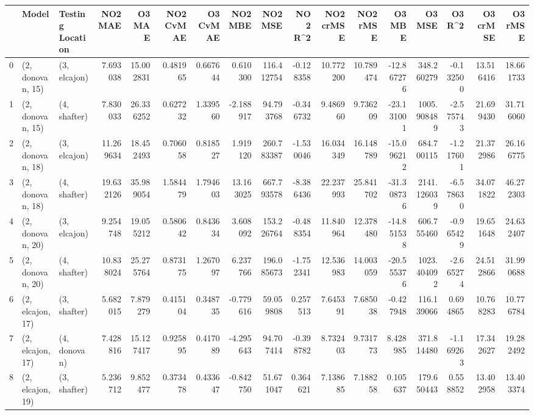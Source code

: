 \begin{tabular}{lllrrrrrrrrrrrrrr}
\toprule
{} &             Model & Testing Location &    NO2 MAE &     O3 MAE &  NO2 CvMAE &  O3 CvMAE &    NO2 MBE &     NO2 MSE &   NO2 R\textasciicircum2 &  NO2 crMSE &   NO2 rMSE &     O3 MBE &       O3 MSE &    O3 R\textasciicircum2 &   O3 crMSE &    O3 rMSE \\
\midrule
0  &  (2, donovan, 15) &     (3, elcajon) &   7.693038 &  15.002831 &   0.481965 &  0.667644 &   0.610300 &  116.412754 & -0.128358 &  10.772200 &  10.789474 & -12.867276 &   348.260279 & -0.132500 &  13.516416 &  18.661733 \\
1  &  (2, donovan, 15) &     (4, shafter) &   7.830033 &  26.336252 &   0.627232 &  1.339560 &  -2.188917 &   94.793768 & -0.346732 &   9.486960 &   9.736209 & -23.131001 &  1005.908489 & -2.575743 &  21.699430 &  31.716060 \\
2  &  (2, donovan, 18) &     (3, elcajon) &  11.269634 &  18.452493 &   0.706058 &  0.818527 &   1.919120 &  260.783387 & -1.530046 &  16.034349 &  16.148789 & -15.096212 &   684.700115 & -1.217601 &  21.372986 &  26.166775 \\
3  &  (2, donovan, 18) &     (4, shafter) &  19.632126 &  35.989054 &   1.584479 &  1.794603 &  13.163025 &  667.793578 & -8.386436 &  22.237993 &  25.841702 & -31.308736 &  2141.126039 & -6.578630 &  34.071822 &  46.272303 \\
4  &  (2, donovan, 20) &     (3, elcajon) &   9.254748 &  19.055212 &   0.580642 &  0.843634 &   3.608092 &  153.226764 & -0.488354 &  11.840964 &  12.378480 & -14.851538 &   606.755460 & -0.965429 &  19.651648 &  24.632407 \\
5  &  (2, donovan, 20) &     (4, shafter) &  10.838024 &  25.275764 &   0.873175 &  1.267097 &   6.237766 &  196.085673 & -1.752341 &  12.536983 &  14.003059 & -20.555376 &  1023.404092 & -2.665274 &  24.512866 &  31.990688 \\
6  &  (2, elcajon, 17) &     (3, shafter) &   5.682015 &   7.879279 &   0.415104 &  0.348735 &  -0.779616 &   59.059808 &  0.257513 &   7.645391 &   7.685038 &  -0.427948 &   116.139066 &  0.694865 &  10.768283 &  10.776784 \\
7  &  (2, elcajon, 17) &     (4, donovan) &   7.428816 &  15.127417 &   0.925895 &  0.417089 &  -4.295643 &   94.707414 & -0.398782 &   8.732403 &   9.731773 &   8.428985 &   371.814480 & -1.169263 &  17.342627 &  19.282492 \\
8  &  (2, elcajon, 19) &     (3, shafter) &   5.236712 &   9.852477 &   0.373478 &  0.433647 &  -0.842750 &   51.671047 &  0.364621 &   7.138685 &   7.188258 &   0.105637 &   179.650443 &  0.558852 &  13.402958 &  13.403374 \\

\end{tabular}
